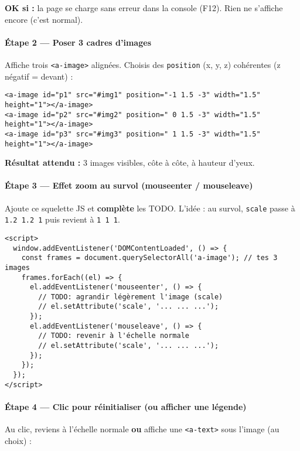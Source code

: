 \documentclass[12pt]{article}
\begin{document}
\begin{checkpoint}
\textbf{OK si :} la page se charge sans erreur dans la console (F12). Rien ne s’affiche encore (c’est normal).
\end{checkpoint}

\paragraph{Étape 2 — Poser 3 cadres d’images}
Affiche trois \texttt{<a-image>} alignées. Choisis des \texttt{position} (x, y, z) cohérentes (z négatif = devant) :

\begin{verbatim}
<a-image id="p1" src="#img1" position="-1 1.5 -3" width="1.5" height="1"></a-image>
<a-image id="p2" src="#img2" position=" 0 1.5 -3" width="1.5" height="1"></a-image>
<a-image id="p3" src="#img3" position=" 1 1.5 -3" width="1.5" height="1"></a-image>
\end{verbatim}

\begin{checkpoint}
\textbf{Résultat attendu :} 3 images visibles, côte à côte, à hauteur d’yeux.
\end{checkpoint}

\paragraph{Étape 3 — Effet zoom au survol (mouseenter / mouseleave)}
Ajoute ce squelette JS et \textbf{complète} les TODO. L’idée : au survol, \texttt{scale} passe à \texttt{1.2 1.2 1} puis revient à \texttt{1 1 1}.

\begin{verbatim}
<script>
  window.addEventListener('DOMContentLoaded', () => {
    const frames = document.querySelectorAll('a-image'); // tes 3 images
    frames.forEach((el) => {
      el.addEventListener('mouseenter', () => {
        // TODO: agrandir légèrement l'image (scale)
        // el.setAttribute('scale', '... ... ...');
      });
      el.addEventListener('mouseleave', () => {
        // TODO: revenir à l'échelle normale
        // el.setAttribute('scale', '... ... ...');
      });
    });
  });
</script>
\end{verbatim}

\paragraph{Étape 4 — Clic pour réinitialiser (ou afficher une légende)}
Au clic, reviens à l’échelle normale \textbf{ou} affiche une \texttt{<a-text>} sous l’image (au choix) :
\end{document}

